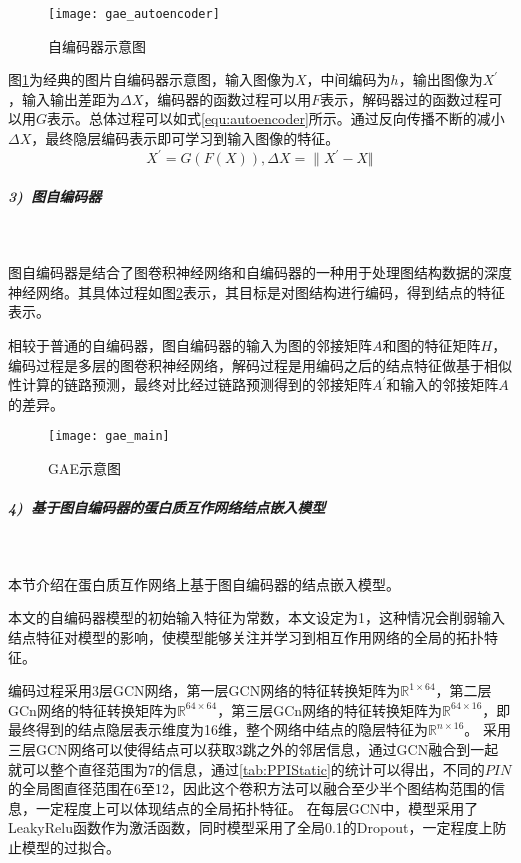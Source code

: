 \begin{figure}[htbp]
    \centering
    \texttt{[image: gae\_autoencoder]}
    \caption{自编码器示意图}
    \label{fig:gae_autoencoder}
\end{figure}

图\ref{fig:gae_autoencoder}为经典的图片自编码器示意图，输入图像为$X$，中间编码为$h$，输出图像为$X^\prime $，输入输出差距为$\varDelta X$，编码器的函数过程可以用$F$表示，解码器过的函数过程可以用$G$表示。总体过程可以如式\ref{equ:autoencoder}所示。通过反向传播不断的减小$\varDelta X$，最终隐层编码表示即可学习到输入图像的特征。
\begin{equation}
    \label{equ:autoencoder}
    X^\prime =G(F(X)),
    \varDelta X={\| X^\prime - X \Vert}
\end{equation}

\subparagraph{3)~图自编码器} ~

图自编码器是结合了图卷积神经网络和自编码器的一种用于处理图结构数据的深度神经网络。其具体过程如图\ref{fig:gae_main}表示，其目标是对图结构进行编码，得到结点的特征表示。

相较于普通的自编码器，图自编码器的输入为图的邻接矩阵$A$和图的特征矩阵$H$，编码过程是多层的图卷积神经网络，解码过程是用编码之后的结点特征做基于相似性计算的链路预测，最终对比经过链路预测得到的邻接矩阵$A^{\prime}$和输入的邻接矩阵$A$的差异。

\begin{figure}[htbp]
    \centering
    \texttt{[image: gae\_main]}
    \caption{GAE示意图\cite{wu_comprehensive_2020}}
    \label{fig:gae_main}
\end{figure}


\subparagraph{4)~基于图自编码器的蛋白质互作网络结点嵌入模型} ~

本节介绍在蛋白质互作网络上基于图自编码器的结点嵌入模型。

本文的自编码器模型的初始输入特征为常数，本文设定为1，这种情况会削弱输入结点特征对模型的影响，使模型能够关注并学习到相互作用网络的全局的拓扑特征。

编码过程采用3层GCN网络，第一层GCN网络的特征转换矩阵为$\mathbb{R} ^{1\times 64}$，第二层GCn网络的特征转换矩阵为$\mathbb{R} ^{64\times 64}$，第三层GCn网络的特征转换矩阵为$\mathbb{R} ^{64\times 16}$，即最终得到的结点隐层表示维度为16维，整个网络中结点的隐层特征为$\mathbb{R} ^{n\times 16}$。
采用三层GCN网络可以使得结点可以获取3跳之外的邻居信息，通过GCN融合到一起就可以整个直径范围为7的信息，通过\ref{tab:PPIStatic}的统计可以得出，不同的$PIN$的全局图直径范围在6至12，因此这个卷积方法可以融合至少半个图结构范围的信息，一定程度上可以体现结点的全局拓扑特征。
在每层GCN中，模型采用了LeakyRelu函数作为激活函数，同时模型采用了全局0.1的Dropout，一定程度上防止模型的过拟合。


